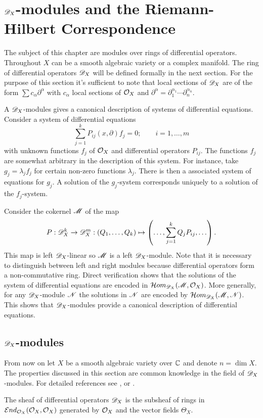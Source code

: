 \chapter{$\mathscr{D}_X$-modules and the Riemann-Hilbert Correspondence}\label{Ch: Chapter1}
The subject of this chapter are modules over rings of differential operators.
Throughout $X$ can be a smooth algebraic variety or a complex manifold.
The ring of differential operators $\mathscr{D}_X$ will be defined formally in the next section.
For the purpose of this section it's sufficient to note that local sections of $\mathscr{D}_X$ are of the form $\sum c_{\alpha } \partial^\alpha$ with $c_{\alpha}$ local sections of $\mathcal{O}_X$ and $\partial^\alpha = \partial_1^{\alpha_1}\cdots \partial_n^{\alpha_n}$.

A $\mathscr{D}_X$-modules gives a canonical description of systems of differential equations.
Consider a system of differential equations
$$\sum_{j=1}^k P_{ij}(x,\partial) f_j = 0; \qquad i= 1,\ldots,m$$
with unknown functions $f_j$ of $\mathcal{O}_X$ and differential operators $P_{ij}$.
The functions $f_j$ are somewhat arbitrary in the description of this system.
For instance, take $g_j=\lambda_j f_j$ for certain non-zero functions $\lambda_j$.
There is then a associated system of equations for $g_j$.
A solution of the $g_j$-system corresponds uniquely to a solution of the $f_j$-system.

Consider the cokernel $\mathscr{M}$ of the map
$$P:\mathscr{D}_X^k \to \mathscr{D}_X^m : \left(Q_1,\ldots, Q_k\right) \mapsto \left(\ldots, \sum_{j=1}^k Q_j P_{ij},\ldots\right).$$
This map is left $\mathscr{D}_X$-linear so $\mathscr{M}$ is a left $\mathscr{D}_X$-module.
Note that it is necessary to distinguish between left and right modules because differential operators form a non-commutative ring.
Direct verification shows that the solutions of the system of differential equations are encoded in $\mathcal{H}om_{\mathscr{D}_X}(\mathscr{M},\mathcal{O}_X)$.
More generally, for any $\mathscr{D}_X$-module $\mathscr{N}$ the solutions in $\mathscr{N}$ are encoded by $\mathcal{H}om_{\mathscr{D}_X}(\mathscr{M},\mathscr{N})$.
This shows that $\mathscr{D}_X$-modules provide a canonical description of differential equations.
\section{$\mathscr{D}_X$-modules}
From now on let $X$ be a smooth algebraic variety over $\mathbb{C}$ and denote $n= \dim X$.
The properties discussed in this section are common knowledge in the field of $\mathscr{D}_X$-modules.
For detailed references see \cite{bjork1979rings}, \cite{kashiwara2003d} or \cite{hotta2007d}.

\begin{definition}
  The sheaf of differential operators $\mathscr{D}_X$ is the subsheaf of rings in $\mathcal{E}nd_{\mathcal{O}_X}(\mathcal{O}_X,\mathcal{O}_X)$ generated by $\mathcal{O}_X$ and the vector fields $\Theta_X$.
\end{definition}
